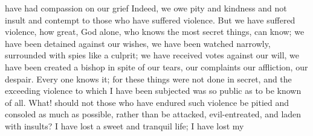 have had compassion on our grief Indeed, we owe pity and kindness and not insult and contempt to those who have suffered violence. But we have suffered violence, how great, God alone, who knows the most secret things, can know; we have been detained against our wishes, we have been watched narrowly, surrounded with spies like a culprit; we have received votes against our will, we have been created a bishop in spite of our tears, our complaints our affliction, our despair. Every one knows it; for these things were not done in secret, and the exceeding violence to which I have been subjected was so public as to be known of all. What! should not those who have endured such violence be pitied and consoled as much as possible, rather than be attacked, evil-entreated, and laden with insults? I have lost a sweet and tranquil life; I have lost my

